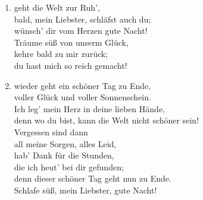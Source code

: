 \def\Titel{Und wieder geht ein schöner Tag zuende}
\def\Interpret{Bruno Elsner}
\def\Referenz{text}

\LiedSetup{}

\begin{guitarMagic}
    \begin{enumerate}
        \item geht die Welt zur Ruh’,\\
            bald, mein Liebster, schläfst auch du;\\
            wünsch’ dir vom Herzen gute Nacht!\\
            Träume süß von unserm Glück,\\
            kehre bald zu mir zurück;\\
            du hast mich so reich gemacht!

        \item wieder geht ein schöner Tag zu Ende,\\
            voller Glück und voller Sonnenschein.\\
            Ich leg’ mein Herz in deine lieben Hände,\\
            denn wo du bist, kann die Welt nicht schöner sein!\\
            Vergessen sind dann\\
            all meine Sorgen, alles Leid,\\
            hab’ Dank für die Stunden,\\
            die ich heut’ bei dir gefunden;\\
            denn dieser schöner Tag geht nun zu Ende.\\
            Schlafe süß, mein Liebster, gute Nacht!
    \end{enumerate}
\end{guitarMagic}
